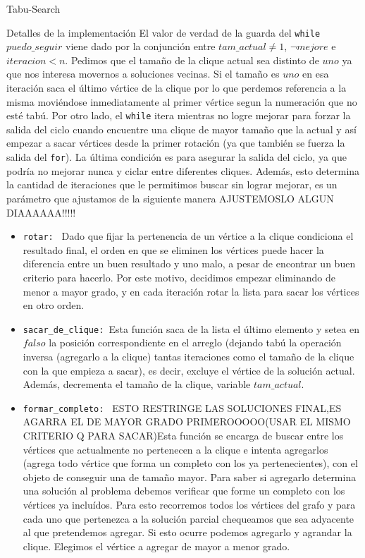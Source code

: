 \begin{section}{Tabu-Search}
\begin{subsection}{Detalles de la implementación}
		El valor de verdad de la guarda del \texttt{while} $puedo\_seguir$ viene dado por la conjunción entre $tam\_actual \neq 1$, $\neg mejore$ e $iteracion<n$.
		Pedimos que el tamaño de la clique actual sea distinto de $uno$ ya que nos interesa movernos a soluciones vecinas. Si el tamaño es $uno$ en esa iteración saca el último vértice de la clique por lo que perdemos referencia a la misma moviéndose inmediatamente al primer vértice segun la numeración que no esté tabú.
		Por otro lado, el \texttt{while} itera mientras no logre mejorar para forzar la salida del ciclo cuando encuentre una clique de mayor tamaño que la actual y así empezar a sacar vértices desde la primer rotación (ya que también se fuerza la salida del \texttt{for}).
		La última condición es para asegurar la salida del ciclo, ya que podría no mejorar nunca y ciclar entre diferentes cliques. Además, esto determina la cantidad de iteraciones que le permitimos buscar sin lograr mejorar, es un parámetro que ajustamos de la siguiente manera AJUSTEMOSLO ALGUN DIAAAAAA!!!!!

		\begin{itemize}			
			\item \texttt{rotar: } Dado que fijar la pertenencia de un vértice a la clique condiciona el resultado final, el orden en que se eliminen los vértices puede hacer la diferencia entre un buen resultado y uno malo, a pesar de encontrar un buen criterio para hacerlo. Por este motivo, decidimos empezar eliminando de menor a mayor grado, y en cada iteración rotar la lista para sacar los vértices en otro orden.
			
			\item \texttt{sacar\_de\_clique: }Esta función saca de la lista el último elemento y setea en $falso$ la posición correspondiente en el arreglo (dejando tabú la operación inversa (agregarlo a la clique) tantas iteraciones como el tamaño de la clique con la que empieza a sacar), es decir, excluye el vértice de la solución actual. Además, decrementa el tamaño de la clique, variable $tam\_actual$.
			
			\item \texttt{formar\_completo: } ESTO RESTRINGE LAS SOLUCIONES FINAL,ES AGARRA EL DE MAYOR GRADO PRIMEROOOOO(USAR EL MISMO CRITERIO Q PARA SACAR)Esta función se encarga de buscar entre los vértices que actualmente no pertenecen a la clique e intenta agregarlos (agrega todo vértice que forma un completo con los ya pertenecientes), con el objeto de conseguir una de tamaño mayor. Para saber si agregarlo determina una solución al problema debemos verificar que forme un completo con los vértices ya incluídos. Para esto recorremos todos los vértices del grafo y para cada uno que pertenezca a la solución parcial chequeamos que sea adyacente al que pretendemos agregar. Si esto ocurre podemos agregarlo y agrandar la clique. Elegimos el vértice a agregar de mayor a menor grado.


\end{itemize}
\end{subsection}
\end{section}
